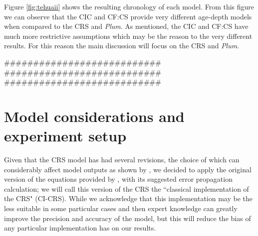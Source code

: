 \documentclass [10pt] {article}
\begin{document}
Figure \ref{fig:tehuaii} shows the resulting chronology of each model. 
From this figure we can observe that the CIC and CF:CS provide very different age-depth models when compared to the CRS and \textit{Plum}. 
As mentioned, the CIC and CF:CS have much more restrictive assumptions which may be the reason to the very different results.
For this reason the main discussion will focus on the CRS and \textit{Plum}.


###########################
###########################
###########################

\section{Model considerations and experiment setup}

Given that the CRS model has had several revisions, the choice of which can considerably affect model outputs as shown by \citet{Barsanti2020}, we decided to apply the original version of the equations provided by \citet{Appleby2001}, with its suggested error propagation calculation; we will call this version of the CRS the ``classical implementation of the CRS" (CI-CRS). 
While we acknowledge that this implementation may be the less suitable in some particular cases and then expert knowledge can greatly improve the precision and accuracy of the model, but this will reduce the bias of any particular implementation has on our results.

\end{document}
